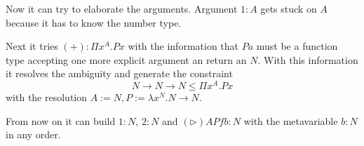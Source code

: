 Now it can try to elaborate the arguments. Argument $1: A$ gets stuck on $A$
because it has to know the number type.

Next it tries $(+): \Pi x^A. P x$ with the information that $P a$ must be a
function type accepting one more explicit argument an return an $N$. With this
information it resolves the ambiguity and generate the constraint
$$
    N \to N \to N \le \Pi x^A. P x
$$
with the resolution $A := N, P := \lambda x^N. N \to N$.

From now on it can build $1: N$, $2: N$ and $(\triangleright) A P f b: N$ with
the metavariable $b: N$ in any order.
